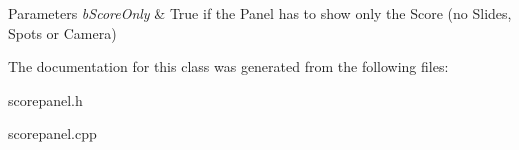 \begin{DoxyParams}{Parameters}
{\em b\+Score\+Only} & True if the Panel has to show only the Score (no Slides, Spots or Camera) \\
\hline
\end{DoxyParams}


The documentation for this class was generated from the following files\+:\begin{DoxyCompactItemize}
\item 
scorepanel.\+h\item 
scorepanel.\+cpp\end{DoxyCompactItemize}
